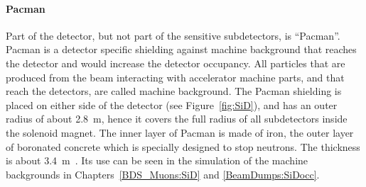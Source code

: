 \paragraph{Pacman}
Part of the \sid detector, but not part of the sensitive subdetectors, is ``Pacman''.
Pacman is a detector specific shielding against machine background that reaches the detector and would increase the detector occupancy.
All particles that are produced from the beam interacting with accelerator machine parts, and that reach the detectors, are called machine background.
The Pacman shielding is placed on either side of the detector (see Figure~\ref{fig:SiD}), and has an outer radius of about \SI{2.8}{\meter}, hence it covers the full radius of all subdetectors inside the solenoid magnet.
The inner layer of Pacman is made of iron, the outer layer of boronated concrete which is specially designed to stop neutrons.
The thickness is about \SI{3.4}{\meter}~\cite{SiD_Geo}.
Its use can be seen in the simulation of the machine backgrounds in Chapters~\ref{BDS_Muons:SiD} and \ref{BeamDumps:SiDocc}.

